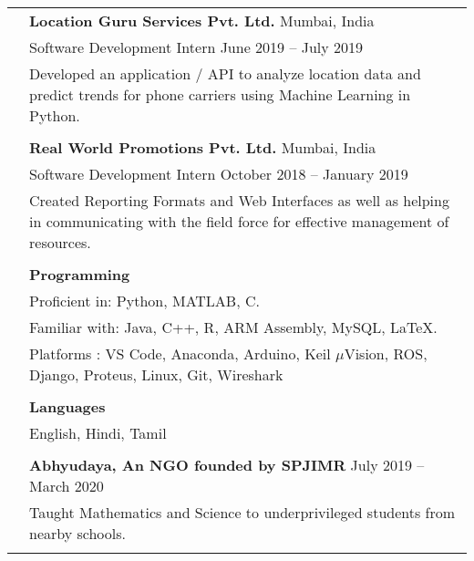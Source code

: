 \documentclass[letterpaper, 11pt]{article}
\begin{document}
\begin{longtable}{p{1.3in}p{4.8in}}
{\color{OliveGreen}{Industry experience}} 
& {\textbf{Location Guru Services Pvt. Ltd.}} \hfill Mumbai, India\\
& Software Development Intern \hfill June 2019 – July 2019 \\
& Developed an application / API to analyze location data and predict trends for phone carriers using Machine Learning in Python. \\
& \\
 
& {\textbf{Real World Promotions Pvt. Ltd.}} \hfill Mumbai, India\\
& Software Development Intern \hfill October 2018 – January 2019 \\
& Created Reporting Formats and Web Interfaces as well as helping in communicating with the field force for effective management of  resources.\\
& \\




{\color{OliveGreen}{Skills}} 
& \textbf{Programming}\\
& Proficient in: Python, MATLAB, C. \\
& Familiar with: Java, C++, R, ARM Assembly, MySQL, \LaTeX. \\
& Platforms : VS Code, Anaconda, Arduino, Keil $\mu$Vision, ROS, Django, Proteus, Linux, Git, Wireshark \\
& \\

& \textbf{Languages} \\
& English, Hindi, Tamil \\
& \\


\color{OliveGreen}{Service and outreach}
& \textbf{Abhyudaya, An NGO founded by SPJIMR} \hfill July 2019 – March 2020 \\
& Taught Mathematics and Science to underprivileged students from nearby schools. \\
& \\



\end{longtable}
\end{document}
